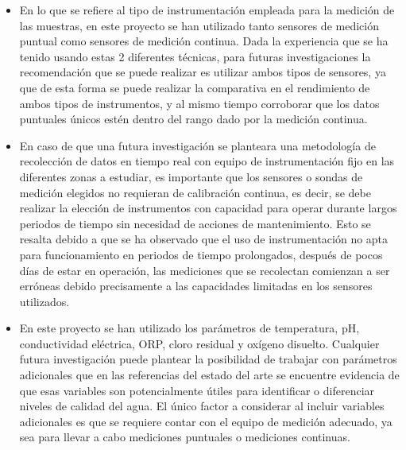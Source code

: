 \begin{itemize}
    \item En lo que se refiere al tipo de instrumentación empleada para la medición de las muestras, en este proyecto se han utilizado tanto sensores de medición puntual como sensores de medición continua. Dada la experiencia 
    que se ha tenido usando estas 2 diferentes técnicas, para futuras investigaciones la recomendación que se puede realizar es utilizar ambos tipos de sensores, ya que de esta forma se puede realizar la comparativa en el 
    rendimiento de ambos tipos de instrumentos, y al mismo tiempo corroborar que los datos puntuales únicos estén dentro del rango dado por la medición continua.
    \item En caso de que una futura investigación se planteara una metodología de recolección de datos en tiempo real con equipo de instrumentación fijo en las diferentes zonas a estudiar, es importante que los sensores o 
    sondas de medición elegidos no requieran de calibración continua, es decir, se debe realizar la elección de instrumentos con capacidad para operar durante largos periodos de tiempo sin necesidad de acciones de mantenimiento.
    Esto se resalta debido a que se ha observado que el uso de instrumentación no apta para funcionamiento en periodos de tiempo prolongados, después de pocos días de estar en operación, las mediciones que se recolectan 
    comienzan a ser erróneas debido precisamente a las capacidades limitadas en los sensores utilizados.
    \item En este proyecto se han utilizado los parámetros de temperatura, pH, conductividad eléctrica, ORP, cloro residual y oxígeno disuelto. Cualquier futura investigación puede plantear la posibilidad de trabajar con 
    parámetros adicionales que en las referencias del estado del arte se encuentre evidencia de que esas variables son potencialmente útiles para identificar o diferenciar niveles de calidad del agua. El único factor a considerar
    al incluir variables adicionales es que se requiere contar con el equipo de medición adecuado, ya sea para llevar a cabo mediciones puntuales o mediciones continuas. 
\end{itemize}
